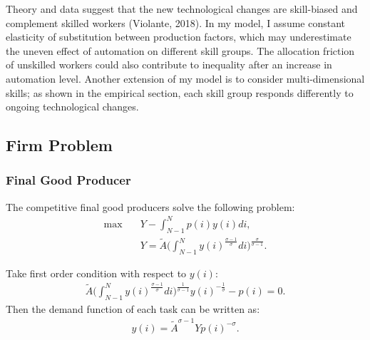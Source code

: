 \documentclass[12pt]{article}
\begin{document}
Theory and data suggest that the new technological changes are skill-biased and complement skilled workers (Violante, 2018\nocite{Violante2008}). In my model, I assume constant elasticity of substitution between production factors, which may underestimate the uneven effect of automation on different skill groups. The allocation friction of unskilled workers could also contribute to inequality after an increase in automation level. Another extension of my model is to consider multi-dimensional skills; as shown in the empirical section, each skill group responds differently to ongoing technological changes. 

\clearpage


\clearpage

\begin{appendices}

\section{Firm Problem}

\subsubsection*{Final Good Producer}
The competitive final good producers solve the following problem:
\begin{align*}
\max \quad & Y-\int_{N-1}^Np(i)y(i)di, \\
&Y = \tilde{A}\Big(\int_{N-1}^{N}y(i)^{\frac{\sigma-1}{\sigma}}di\Big)^{\frac{\sigma}{\sigma-1}}.
\end{align*}

Take first order condition with respect to $y(i)$:
\begin{align*}
\tilde{A}\Big(\int_{N-1}^{N}y(i)^{\frac{\sigma-1}{\sigma}}di\Big)^{\frac{1}{\sigma-1}}y(i)^{-\frac{1}{\sigma}}-p(i) = 0.
\end{align*}
Then the demand function of each task can be written as:
\begin{align*}
y(i) = \tilde{A}^{\sigma-1}Yp(i)^{-\sigma}.
\end{align*}


\end{appendices}
\end{document}
